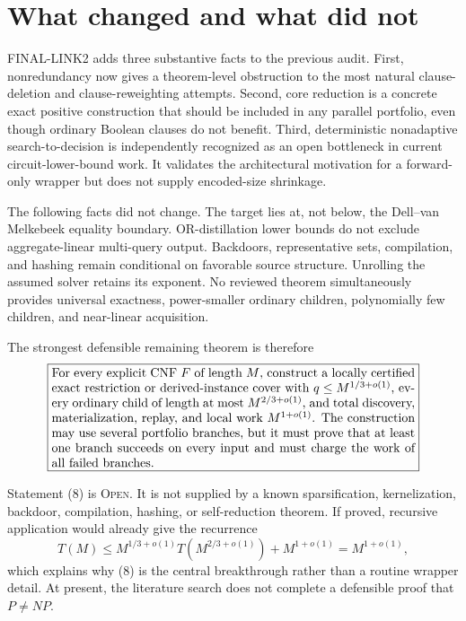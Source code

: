 \documentclass[11pt]{article}
\newcommand{\Open}{\textsc{Open}}
\begin{document}
\section{What changed and what did not}

FINAL-LINK2 adds three substantive facts to the previous audit.  First,
nonredundancy now gives a theorem-level obstruction to the most natural
clause-deletion and clause-reweighting attempts.  Second, core reduction is
a concrete exact positive construction that should be included in any
parallel portfolio, even though ordinary Boolean clauses do not benefit.
Third, deterministic nonadaptive search-to-decision is independently
recognized as an open bottleneck in current circuit-lower-bound work.  It
validates the architectural motivation for a forward-only wrapper but does
not supply encoded-size shrinkage.

The following facts did not change.  The target lies at, not below, the
Dell--van Melkebeek equality boundary.  OR-distillation lower bounds do not
exclude aggregate-linear multi-query output.  Backdoors, representative
sets, compilation, and hashing remain conditional on favorable source
structure.  Unrolling the assumed solver retains its exponent.  No reviewed
theorem simultaneously provides universal exactness, power-smaller
ordinary children, polynomially few children, and near-linear acquisition.

The strongest defensible remaining theorem is therefore
\[
 \boxed{\begin{minipage}{0.84\textwidth}
 For every explicit CNF $F$ of length $M$, construct a locally certified
 exact restriction or derived-instance cover with
 $q\le M^{1/3+o(1)}$, every ordinary child of length at most
 $M^{2/3+o(1)}$, and total discovery, materialization, replay, and local work
 $M^{1+o(1)}$.  The construction may use several portfolio branches, but it
 must prove that at least one branch succeeds on every input and must charge
 the work of all failed branches.
 \end{minipage}}
\]

Statement (8) is \Open.  It is not supplied by a known sparsification,
kernelization, backdoor, compilation, hashing, or self-reduction theorem.
If proved, recursive application would already give the recurrence
\[
 T(M)\le M^{1/3+o(1)}T(M^{2/3+o(1)})+M^{1+o(1)}
      =M^{1+o(1)},
\]
which explains why (8) is the central breakthrough rather than a routine
wrapper detail.  At present, the literature search does not complete a
defensible proof that $P\ne NP$.
\end{document}
